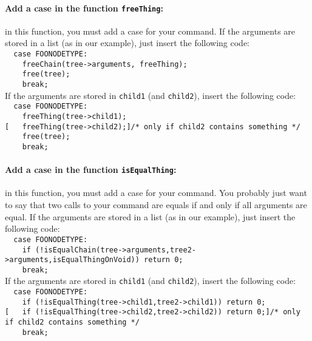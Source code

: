 \documentclass{article}
\newcommand{\commandNodeName}{\texttt{FOONODETYPE}\xspace}
\begin{document}
\paragraph{Add a case in the function \texttt{freeThing}: } in this function, you must add a case for your command. If the arguments are stored in a list (as in our example), just insert the following code:\\
\phantom{1}\texttt{~~case }\commandNodeName\texttt{:}\\
\phantom{1}\texttt{~~~~freeChain(tree->arguments, freeThing);}\\
\phantom{1}\texttt{~~~~free(tree);}\\
\phantom{1}\texttt{~~~~break;}\\
If the arguments are stored in \texttt{child1} (and \texttt{child2}), insert the following code:\\
\phantom{1}\texttt{~~case }\commandNodeName\texttt{:}\\
\phantom{1}\texttt{~~~~freeThing(tree->child1);}\\
\phantom{1}\texttt{[~~~freeThing(tree->child2);]\qquad /* only if child2 contains something */}\\
\phantom{1}\texttt{~~~~free(tree);}\\
\phantom{1}\texttt{~~~~break;}\\         


\paragraph{Add a case in the function \texttt{isEqualThing}: } in this function, you must add a case for your command. You probably just want to say that two calls to your command are equals if and only if all arguments are equal. If the arguments are stored in a list (as in our example), just insert the following code:\\
\phantom{1}\texttt{~~case }\commandNodeName\texttt{:}\\
\phantom{1}\texttt{~~~~if (!isEqualChain(tree->arguments,tree2->arguments,isEqualThingOnVoid)) return 0;}\\
\phantom{1}\texttt{~~~~break;}\\
If the arguments are stored in \texttt{child1} (and \texttt{child2}), insert the following code:\\
\phantom{1}\texttt{~~case }\commandNodeName\texttt{:}\\
\phantom{1}\texttt{~~~~if (!isEqualThing(tree->child1,tree2->child1)) return 0;}\\
\phantom{1}\texttt{[~~~if (!isEqualThing(tree->child2,tree2->child2)) return 0;]\qquad /* only if child2 contains something */}\\
\phantom{1}\texttt{~~~~break;}\\         
\end{document}
